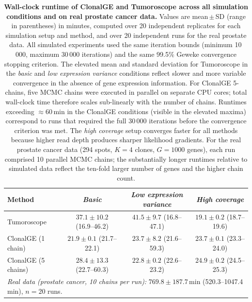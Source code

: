\documentclass[unnumsec,webpdf,contemporary,large]{oup-authoring-template}%
\theoremstyle{thmstyleone}%
\theoremstyle{thmstyletwo}%
\theoremstyle{thmstylethree}%
\newcommand{\rev}[1]{{\color{revisionblue}#1}}
\begin{document}
\begin{table}[ht]
\centering
\rev{
\caption{%
\textbf{Wall-clock runtime of ClonalGE and Tumoroscope across all simulation
conditions and on real prostate cancer data.}
Values are mean\,$\pm$\,SD (range in parentheses) in minutes, computed over
20 independent replicates for each simulation setup and method, and over 20
independent runs for the real prostate data.
All simulated experiments used the same iteration bounds (minimum 10\,000,
maximum 30\,000 iterations) and the same 99.5\% Geweke convergence stopping
criterion.
The elevated mean and standard deviation for Tumoroscope in the
\textit{basic} and \textit{low expression variance} conditions reflect
slower and more variable convergence in the absence of gene expression
information.
For ClonalGE 5-chains, five MCMC chains were executed in parallel on
separate CPU cores; total wall-clock time therefore scales sub-linearly with
the number of chains.
Runtimes exceeding $\approx$60\,min in the ClonalGE conditions (visible in
the elevated maxima) correspond to runs that required the full 30\,000
iterations before the convergence criterion was met.
The \textit{high coverage} setup converges faster for all methods because
higher read depth produces sharper likelihood gradients.
For the real prostate cancer data (294 spots, $K=4$ clones, $G=1000$ genes),
each run comprised 10 parallel MCMC chains; the substantially longer runtimes
relative to simulated data reflect the ten-fold larger number of genes
and the higher chain count.
}
\label{tab:runtime}
\small
\begin{tabular}{lccc}
\hline
\textbf{Method}
  & \textbf{\textit{Basic}}
  & \textbf{\textit{Low expression variance}}
  & \textbf{\textit{High coverage}} \\
\hline
Tumoroscope
  & $37.1 \pm 10.2$ (16.9--46.2)
  & $41.5 \pm 9.7$ (16.8--47.1)
  & $19.1 \pm 0.2$ (18.7--19.6) \\
ClonalGE (1 chain)
  & $21.9 \pm 0.1$ (21.7--22.1)
  & $23.7 \pm 8.2$ (21.6--59.3)
  & $23.7 \pm 0.1$ (23.3--24.0) \\
ClonalGE (5 chains)
  & $28.4 \pm 13.3$ (22.7--60.3)
  & $22.8 \pm 0.2$ (22.6--23.2)
  & $24.9 \pm 0.2$ (24.5--25.3) \\
\hline
\multicolumn{4}{l}{%
\textit{Real data (prostate cancer, 10 chains per run):}
$769.8 \pm 187.7$\,min (520.3--1047.4\,min), $n=20$ runs.} \\
\hline
\end{tabular}
}
\end{table}
\end{document}
